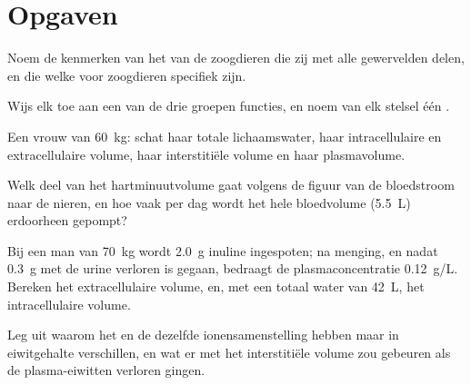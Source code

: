 \section{Opgaven}

\begin{exercise}[$\star$]\label{exo:b1:mammal-organization:1}
Noem de kenmerken van het  van de zoogdieren die zij met alle
gewervelden delen, en die welke voor zoogdieren specifiek zijn.
\end{exercise}

\begin{exercise}[$\star$]\label{exo:b1:mammal-organization:2}
Wijs elk  toe aan een van de drie groepen functies, en noem van
elk stelsel één .
\end{exercise}

\begin{exercise}[$\star$]\label{exo:b1:mammal-organization:3}
Een vrouw van \qty{60}{kg}: schat haar totale lichaamswater, haar
intracellulaire en extracellulaire volume, haar interstitiële volume en haar
plasmavolume.
\end{exercise}

\begin{exercise}[$\star$]\label{exo:b1:mammal-organization:4}
Welk deel van het hartminuutvolume gaat volgens de figuur van de bloedstroom
naar de nieren, en hoe vaak per dag wordt het hele bloedvolume
(\qty{5.5}{L}) erdoorheen gepompt?
\end{exercise}

\begin{exercise}[$\star\star$]\label{exo:b1:mammal-organization:5}
Bij een man van \qty{70}{kg} wordt \qty{2.0}{g} inuline ingespoten; na menging,
en nadat \qty{0.3}{g} met de urine verloren is gegaan, bedraagt de
plasmaconcentratie \qty{0.12}{g/L}. Bereken het extracellulaire volume, en, met
een totaal water van \qty{42}{L}, het intracellulaire volume.
\end{exercise}

\begin{exercise}[$\star\star$]\label{exo:b1:mammal-organization:6}
Leg uit waarom het  en de  dezelfde
ionensamenstelling hebben maar in eiwitgehalte verschillen, en wat er met het
interstitiële volume zou gebeuren als de plasma-eiwitten verloren gingen.
\end{exercise}

